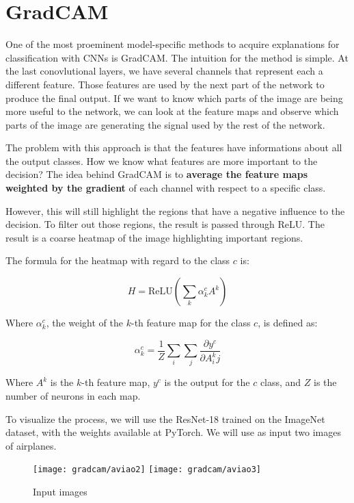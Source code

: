 \chapter{GradCAM}

One of the most proeminent model-specific methods to acquire explanations for classification with CNNs is GradCAM. The intuition for the method is simple. At the last conovlutional layers, we have several channels that represent each a different feature. Those features are used by the next part of the network to produce the final output. If we want to know which parts of the image are being more useful to the network, we can look at the feature maps and observe which parts of the image are generating the signal used by the rest of the network. 

The problem with this approach is that the features have informations about all the output classes. How we know what features are more important to the decision? The idea behind GradCAM is to \textbf{average the feature maps weighted by the gradient} of each channel with respect to a specific class. 

However, this will still highlight the regions that have a negative influence to the decision. To filter out those regions, the result is passed through ReLU. The result is a coarse heatmap of the image highlighting important regions.

The formula for the heatmap with regard to the class $c$ is:

\begin{equation}
    H  = \text{ReLU}(\sum_k \alpha_k^c A^k)
    \label{eq:heatmap}
\end{equation}

Where $\alpha_k^c$, the weight of the $k$-th feature map for the class $c$, is defined as:

\begin{equation}
    \alpha_k^c=\frac{1}{Z} \sum_i \sum_j \frac{\partial y^c}{\partial A^k_ij}
    \label{eq:alpha}
\end{equation}

Where $A^k$ is the $k$-th feature map, $y^c$ is the output for the $c$ class, and $Z$ is the number of neurons in each map.

To visualize the process, we will use the ResNet-18 \cite{resnet} trained on the ImageNet dataset, with the weights available at PyTorch. We will use as input two images of airplanes.

\begin{figure}
    \centering
    \texttt{[image: gradcam/aviao2]}
    \texttt{[image: gradcam/aviao3]}
    \caption{Input images}
\end{figure}

